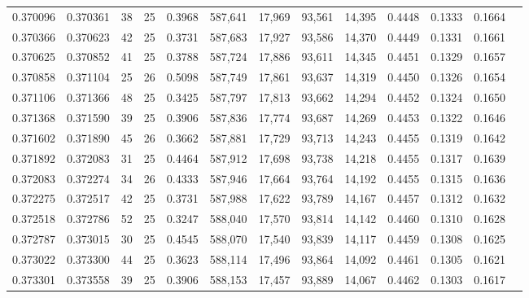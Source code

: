 \begin{tabular}{rrrrrrrrrrrrr}
0.370096 & 0.370361 &    38 &  25 &                                     0.3968 & 587,641 &  17,969 &  93,561 &  14,395 & 0.4448 & 0.1333 & 0.1664 \\
0.370366 & 0.370623 &    42 &  25 &                                     0.3731 & 587,683 &  17,927 &  93,586 &  14,370 & 0.4449 & 0.1331 & 0.1661 \\
0.370625 & 0.370852 &    41 &  25 &                                     0.3788 & 587,724 &  17,886 &  93,611 &  14,345 & 0.4451 & 0.1329 & 0.1657 \\
0.370858 & 0.371104 &    25 &  26 &                                     0.5098 & 587,749 &  17,861 &  93,637 &  14,319 & 0.4450 & 0.1326 & 0.1654 \\
0.371106 & 0.371366 &    48 &  25 &                                     0.3425 & 587,797 &  17,813 &  93,662 &  14,294 & 0.4452 & 0.1324 & 0.1650 \\
0.371368 & 0.371590 &    39 &  25 &                                     0.3906 & 587,836 &  17,774 &  93,687 &  14,269 & 0.4453 & 0.1322 & 0.1646 \\
0.371602 & 0.371890 &    45 &  26 &                                     0.3662 & 587,881 &  17,729 &  93,713 &  14,243 & 0.4455 & 0.1319 & 0.1642 \\
0.371892 & 0.372083 &    31 &  25 &                                     0.4464 & 587,912 &  17,698 &  93,738 &  14,218 & 0.4455 & 0.1317 & 0.1639 \\
0.372083 & 0.372274 &    34 &  26 &                                     0.4333 & 587,946 &  17,664 &  93,764 &  14,192 & 0.4455 & 0.1315 & 0.1636 \\
0.372275 & 0.372517 &    42 &  25 &                                     0.3731 & 587,988 &  17,622 &  93,789 &  14,167 & 0.4457 & 0.1312 & 0.1632 \\
0.372518 & 0.372786 &    52 &  25 &                                     0.3247 & 588,040 &  17,570 &  93,814 &  14,142 & 0.4460 & 0.1310 & 0.1628 \\
0.372787 & 0.373015 &    30 &  25 &                                     0.4545 & 588,070 &  17,540 &  93,839 &  14,117 & 0.4459 & 0.1308 & 0.1625 \\
0.373022 & 0.373300 &    44 &  25 &                                     0.3623 & 588,114 &  17,496 &  93,864 &  14,092 & 0.4461 & 0.1305 & 0.1621 \\
0.373301 & 0.373558 &    39 &  25 &                                     0.3906 & 588,153 &  17,457 &  93,889 &  14,067 & 0.4462 & 0.1303 & 0.1617 \\

\end{tabular}
